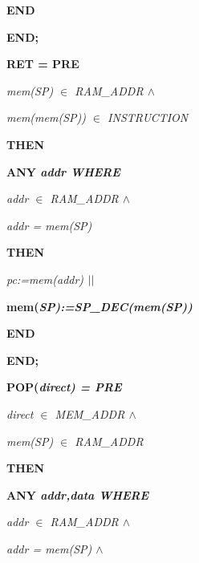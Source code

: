 \begin{sloppypar}
\hspace*{0.20in}\bf END

\hspace*{0.10in}\bf END\rm ;

\hspace*{0.10in}\bf RET \rm = \bf PRE

\hspace*{0.20in}\it mem\rm (\it SP\rm ) $\in$  \it RAM\_ADDR  $\land$ 

\hspace*{0.20in}\it mem\rm (\it mem\rm (\it SP\rm )\rm ) $\in$  \it INSTRUCTION

\hspace*{0.10in}\bf THEN

\hspace*{0.20in}\bf ANY \it addr \bf WHERE

\hspace*{0.30in}\it addr $\in$  \it RAM\_ADDR  $\land$ 

\hspace*{0.30in}\it addr \rm = \it mem\rm (\it SP\rm )

\hspace*{0.20in}\bf THEN

\hspace*{0.30in}\it pc\rm :=\it mem\rm (\it addr\rm )  $\mbox{$\mid\mid$}$ 

\hspace*{0.30in}\bf mem\rm (\it SP\rm )\rm :=\it SP\_DEC\rm (\it mem\rm (\it SP\rm )\rm )

\hspace*{0.20in}\bf END

\hspace*{0.10in}\bf END\rm ;

\hspace*{0.10in}\bf POP\rm (\it direct\rm ) \rm = \bf PRE

\hspace*{0.20in}\it direct $\in$  \it MEM\_ADDR  $\land$ 

\hspace*{0.20in}\it mem\rm (\it SP\rm ) $\in$  \it RAM\_ADDR

\hspace*{0.10in}\bf THEN

\hspace*{0.20in}\bf ANY \it addr\rm ,\it data \bf WHERE

\hspace*{0.30in}\it addr $\in$  \it RAM\_ADDR  $\land$ 

\hspace*{0.30in}\it addr \rm = \it mem\rm (\it SP\rm )  $\land$ 


\end{sloppypar}
